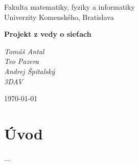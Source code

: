 \documentclass[12pt,a4paper]{article}
\begin{document}
\begin{titlepage}
  \centering

  {\large
    Fakulta matematiky, fyziky a informatiky\\
    Univerzity Komenského, Bratislava
  }\par

  \vspace{4cm}

  {\bfseries\LARGE
    Projekt z vedy o sieťach
  }\par

  \vspace{0.5cm}

  \vfill

  \begin{flushleft}
    {\itshape
      Tomáš Antal\\
      Teo Pazera\\
      Andrej Špitalský \\
      3DAV
    }
  \end{flushleft}

  \begin{flushright}
    \today
  \end{flushright}

\end{titlepage}

\newpage

\section{Úvod}
...


\end{document}
